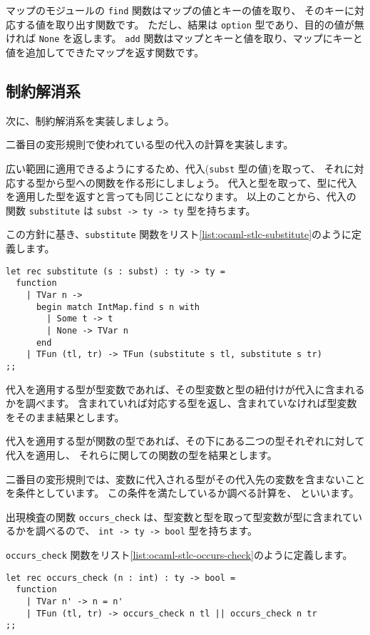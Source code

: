 マップのモジュールの \texttt{find} 関数はマップの値とキーの値を取り、
そのキーに対応する値を取り出す関数です。
ただし、結果は \texttt{option} 型であり、目的の値が無ければ \texttt{None} を返します。
\texttt{add} 関数はマップとキーと値を取り、マップにキーと値を追加してできたマップを返す関数です。

\subsection{制約解消系}

次に、制約解消系を実装しましょう。

二番目の変形規則で使われている型の代入の計算を実装します。

広い範囲に適用できるようにするため、代入(\texttt{subst} 型の値)を取って、
それに対応する型から型への関数を作る形にしましょう。
代入と型を取って、型に代入を適用した型を返すと言っても同じことになります。
以上のことから、代入の関数 \texttt{substitute} は \texttt{subst -> ty -> ty} 型を持ちます。

この方針に基き、\texttt{substitute} 関数をリスト\ref{list:ocaml-stlc-substitute}のように定義します。

\begin{lstlisting}[caption=代入, label=list:ocaml-stlc-substitute]
let rec substitute (s : subst) : ty -> ty =
  function
    | TVar n ->
      begin match IntMap.find s n with
        | Some t -> t
        | None -> TVar n
      end
    | TFun (tl, tr) -> TFun (substitute s tl, substitute s tr)
;;
\end{lstlisting}

代入を適用する型が型変数であれば、その型変数と型の紐付けが代入に含まれるかを調べます。
含まれていれば対応する型を返し、含まれていなければ型変数をそのまま結果とします。

代入を適用する型が関数の型であれば、その下にある二つの型それぞれに対して代入を適用し、
それらに関しての関数の型を結果とします。

二番目の変形規則では、変数に代入される型がその代入先の変数を含まないことを条件としています。
この条件を満たしているか調べる計算を、 といいます。

出現検査の関数 \texttt{occurs\_check} は、型変数と型を取って型変数が型に含まれているかを調べるので、
\texttt{int -> ty -> bool} 型を持ちます。

\texttt{occurs\_check} 関数をリスト\ref{list:ocaml-stlc-occurs-check}のように定義します。

\begin{lstlisting}[caption=出現検査, label=list:ocaml-stlc-occurs-check]
let rec occurs_check (n : int) : ty -> bool =
  function
    | TVar n' -> n = n'
    | TFun (tl, tr) -> occurs_check n tl || occurs_check n tr
;;
\end{lstlisting}

